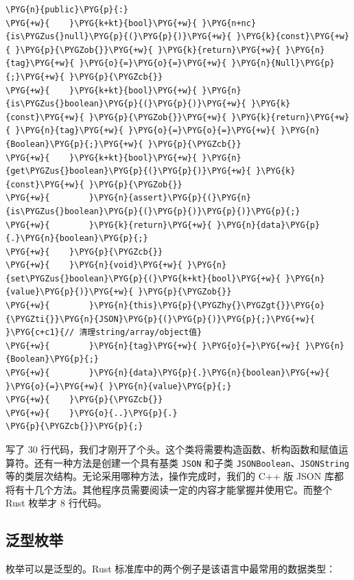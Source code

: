 \begin{Verbatim}[commandchars=\\\{\},breaklines=true,breakanywhere=true,fontsize=\codefont,xleftmargin=17bp]
\PYG{n}{public}\PYG{p}{:}
\PYG{+w}{    }\PYG{k+kt}{bool}\PYG{+w}{ }\PYG{n+nc}{is\PYGZus{}null}\PYG{p}{(}\PYG{p}{)}\PYG{+w}{ }\PYG{k}{const}\PYG{+w}{ }\PYG{p}{\PYGZob{}}\PYG{+w}{ }\PYG{k}{return}\PYG{+w}{ }\PYG{n}{tag}\PYG{+w}{ }\PYG{o}{=}\PYG{o}{=}\PYG{+w}{ }\PYG{n}{Null}\PYG{p}{;}\PYG{+w}{ }\PYG{p}{\PYGZcb{}}
\PYG{+w}{    }\PYG{k+kt}{bool}\PYG{+w}{ }\PYG{n}{is\PYGZus{}boolean}\PYG{p}{(}\PYG{p}{)}\PYG{+w}{ }\PYG{k}{const}\PYG{+w}{ }\PYG{p}{\PYGZob{}}\PYG{+w}{ }\PYG{k}{return}\PYG{+w}{ }\PYG{n}{tag}\PYG{+w}{ }\PYG{o}{=}\PYG{o}{=}\PYG{+w}{ }\PYG{n}{Boolean}\PYG{p}{;}\PYG{+w}{ }\PYG{p}{\PYGZcb{}}
\PYG{+w}{    }\PYG{k+kt}{bool}\PYG{+w}{ }\PYG{n}{get\PYGZus{}boolean}\PYG{p}{(}\PYG{p}{)}\PYG{+w}{ }\PYG{k}{const}\PYG{+w}{ }\PYG{p}{\PYGZob{}}
\PYG{+w}{        }\PYG{n}{assert}\PYG{p}{(}\PYG{n}{is\PYGZus{}boolean}\PYG{p}{(}\PYG{p}{)}\PYG{p}{)}\PYG{p}{;}
\PYG{+w}{        }\PYG{k}{return}\PYG{+w}{ }\PYG{n}{data}\PYG{p}{.}\PYG{n}{boolean}\PYG{p}{;}
\PYG{+w}{    }\PYG{p}{\PYGZcb{}}
\PYG{+w}{    }\PYG{n}{void}\PYG{+w}{ }\PYG{n}{set\PYGZus{}boolean}\PYG{p}{(}\PYG{k+kt}{bool}\PYG{+w}{ }\PYG{n}{value}\PYG{p}{)}\PYG{+w}{ }\PYG{p}{\PYGZob{}}
\PYG{+w}{        }\PYG{n}{this}\PYG{p}{\PYGZhy{}\PYGZgt{}}\PYG{o}{\PYGZti{}}\PYG{n}{JSON}\PYG{p}{(}\PYG{p}{)}\PYG{p}{;}\PYG{+w}{  }\PYG{c+c1}{// 清理string/array/object值}
\PYG{+w}{        }\PYG{n}{tag}\PYG{+w}{ }\PYG{o}{=}\PYG{+w}{ }\PYG{n}{Boolean}\PYG{p}{;}
\PYG{+w}{        }\PYG{n}{data}\PYG{p}{.}\PYG{n}{boolean}\PYG{+w}{ }\PYG{o}{=}\PYG{+w}{ }\PYG{n}{value}\PYG{p}{;}
\PYG{+w}{    }\PYG{p}{\PYGZcb{}}
\PYG{+w}{    }\PYG{o}{..}\PYG{p}{.}
\PYG{p}{\PYGZcb{}}\PYG{p}{;}
\end{Verbatim}

写了 30 行代码，我们才刚开了个头。这个类将需要构造函数、析构函数和赋值运算符。还有一种方法是创建一个具有基类 \texttt{JSON} 和子类 \texttt{JSONBoolean}、\texttt{JSONString} 等的类层次结构。无论采用哪种方法，操作完成时，我们的 C++ 版 JSON 库都将有十几个方法。其他程序员需要阅读一定的内容才能掌握并使用它。而整个 Rust 枚举才 8 行代码。

\subsection{泛型枚举}

枚举可以是泛型的。Rust 标准库中的两个例子是该语言中最常用的数据类型：


